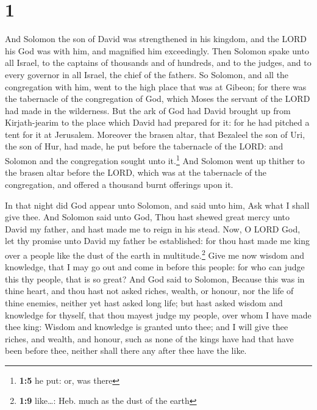 \hypertarget{section}{%
\section{1}\label{section}}

 And Solomon the son of David was strengthened in his
kingdom, and the LORD his God was with him, and magnified him
exceedingly.  Then Solomon spake unto all Israel, to the
captains of thousands and of hundreds, and to the judges, and to every
governor in all Israel, the chief of the fathers.  So
Solomon, and all the congregation with him, went to the high place that
was at Gibeon; for there was the tabernacle of the congregation of God,
which Moses the servant of the LORD had made in the wilderness.
 But the ark of God had David brought up from
Kirjath-jearim to the place which David had prepared for it: for he had
pitched a tent for it at Jerusalem.  Moreover the brasen
altar, that Bezaleel the son of Uri, the son of Hur, had made, he put
before the tabernacle of the LORD: and Solomon and the congregation
sought unto it.\footnote{\textbf{1:5} he put: or, was there}
 And Solomon went up thither to the brasen altar before
the LORD, which was at the tabernacle of the congregation, and offered a
thousand burnt offerings upon it.

 In that night did God appear unto Solomon, and said unto
him, Ask what I shall give thee.  And Solomon said unto
God, Thou hast shewed great mercy unto David my father, and hast made me
to reign in his stead.  Now, O LORD God, let thy promise
unto David my father be established: for thou hast made me king over a
people like the dust of the earth in multitude.\footnote{\textbf{1:9}
  like\ldots: Heb. much as the dust of the earth}  Give
me now wisdom and knowledge, that I may go out and come in before this
people: for who can judge this thy people, that is so great?
 And God said to Solomon, Because this was in thine
heart, and thou hast not asked riches, wealth, or honour, nor the life
of thine enemies, neither yet hast asked long life; but hast asked
wisdom and knowledge for thyself, that thou mayest judge my people, over
whom I have made thee king:  Wisdom and knowledge is
granted unto thee; and I will give thee riches, and wealth, and honour,
such as none of the kings have had that have been before thee, neither
shall there any after thee have the like.

